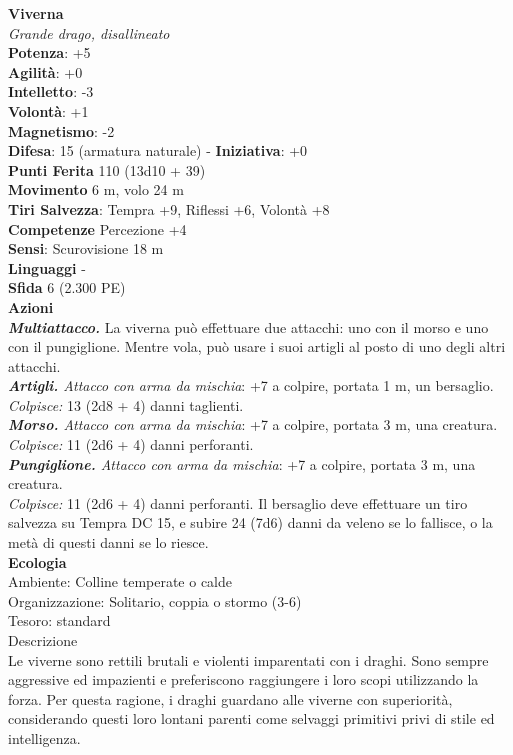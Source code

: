 \begin{multicols}{2}
\medskip\textbf{Viverna}\\
\emph{Grande drago, disallineato}\\
\textbf{Potenza}: +5\\
\textbf{Agilità}: +0\\
\textbf{Intelletto}: -3\\
\textbf{Volontà}: +1\\
\textbf{Magnetismo}: -2\\
\textbf{Difesa}: 15 (armatura naturale) - \textbf{Iniziativa}: +0\\
\textbf{Punti Ferita} 110 (13d10 + 39)\\
\textbf{Movimento} 6 m, volo 24 m\\
\textbf{Tiri Salvezza}: Tempra +9, Riflessi +6, Volontà +8\\
\textbf{Competenze} Percezione +4\\
\textbf{Sensi}: Scurovisione 18 m\\
\textbf{Linguaggi} -\\
\textbf{Sfida} 6 (2.300 PE)\smallskip\\
\smallskip\textbf{Azioni}\\
\emph{\textbf{Multiattacco.}} La viverna può effettuare due attacchi: uno con il morso e uno con il pungiglione. Mentre vola, può usare i suoi artigli al posto di uno degli altri attacchi.\\
\emph{\textbf{Artigli.} Attacco con arma da mischia}: +7 a colpire, portata 1 m, un bersaglio.\\
\emph{Colpisce:} 13 (2d8 + 4) danni taglienti.\\
\emph{\textbf{Morso.} Attacco con arma da mischia}: +7 a colpire, portata 3 m, una creatura.\\
\emph{Colpisce:} 11 (2d6 + 4) danni perforanti.\\
\emph{\textbf{Pungiglione.} Attacco con arma da mischia}: +7 a colpire, portata 3 m, una creatura.\\
\emph{Colpisce:} 11 (2d6 + 4) danni perforanti. Il bersaglio deve effettuare un tiro salvezza su Tempra DC 15, e subire 24 (7d6) danni da veleno se lo fallisce, o la metà di questi danni se lo riesce.\\
\textbf{Ecologia}\\
Ambiente: Colline temperate o calde\\
Organizzazione: Solitario, coppia o stormo (3-6)\\
Tesoro: standard\\
Descrizione\\
Le viverne sono rettili brutali e violenti imparentati con i draghi. Sono sempre aggressive ed impazienti e preferiscono raggiungere i loro scopi utilizzando la forza. Per questa ragione, i draghi guardano alle viverne con superiorità, considerando questi loro lontani parenti come selvaggi primitivi privi di stile ed intelligenza.\\


\end{multicols}
